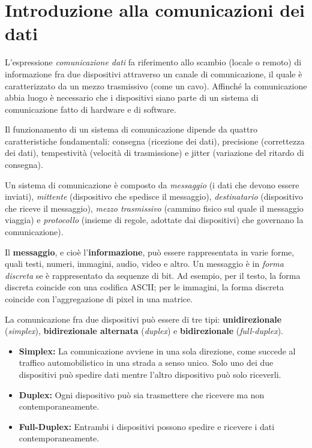 \section{Introduzione alla comunicazioni dei dati}
    L’espressione \textit{comunicazione dati} fa riferimento allo scambio (locale o remoto) di informazione fra due dispositivi attraverso un canale di comunicazione, il quale è caratterizzato da un mezzo trasmissivo (come un cavo). Affinché la comunicazione abbia luogo è necessario che i dispositivi siano parte di un sistema di comunicazione fatto di hardware e di software. 
    
    Il funzionamento di un sistema di comunicazione dipende da quattro caratteristiche fondamentali: consegna (ricezione dei dati), precisione (correttezza dei dati), tempestività (velocità di trasmissione) e jitter (variazione del ritardo di consegna).

    \vspace{3mm}
    
    Un sistema di comunicazione è composto da \textit{messaggio} (i dati che devono essere inviati), \textit{mittente} (dispositivo che spedisce il messaggio), \textit{destinatario} (dispositivo che riceve il messaggio), \textit{mezzo trasmissivo} (cammino fisico sul quale il messaggio viaggia) e \textit{protocollo} (insieme di regole, adottate dai dispositivi) che governano la comunicazione).
    
    \vspace{3mm}
    
    Il \textbf{messaggio}, e cioè l'\textbf{informazione}, può essere rappresentata in varie forme, quali testi, numeri, immagini, audio, video e altro. Un messaggio è in \textit{forma discreta} se è rappresentato da sequenze di bit. Ad esempio, per il testo, la forma discreta coincide con una codifica ASCII; per le immagini, la forma discreta coincide con l'aggregazione di pixel in una matrice.
    
    \vspace{3mm}
    
    La comunicazione fra due dispositivi può essere di tre tipi: \textbf{unidirezionale} (\textit{simplex}), \textbf{bidirezionale alternata} (\textit{duplex}) e \textbf{bidirezionale} (\textit{full-duplex}).
    
    \begin{itemize}
        \item 
        \textbf{Simplex:} La comunicazione avviene in una sola direzione, come succede al traffico automobilistico in una strada a senso unico. Solo uno dei due dispositivi può spedire dati mentre l’altro dispositivo può solo riceverli.
    
        \item
        \textbf{Duplex:} Ogni dispositivo può sia trasmettere che ricevere ma non contemporaneamente.
        
        \item
        \textbf{Full-Duplex:} Entrambi i dispositivi possono spedire e ricevere i dati contemporaneamente.
    \end{itemize}
    

